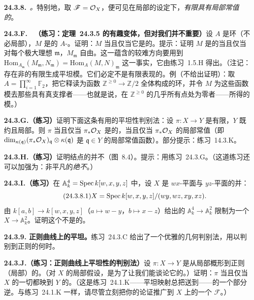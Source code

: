 \textbf{24.3.8.}\ \emph{\trhRemark。}\quad 特别地，取 $\mathscr{F}=\mathcal{O}_X$，便可见在局部\trNoether{}的设定下，\emph{有限\trFlat{}\trMorphism{}具有局部常值的\trDegree}。

\textbf{24.3.F.}\ \hard\ \textbf{（练习：\mbox{定理~24.3.5} 的有趣变体，但对我们并不重要）}\quad 设 $A$ 是环（不必局部），$M$ 是\trFinitelyPresented{}的 $A$-\trModule。证明：$M$ \trFlat{}当且仅当它是\trProjectiveObj{}的。提示：证明 $M$ 是\trProjectiveObj{}的当且仅当对每个极大理想 $\mathfrak{m}$，$M_\mathfrak{m}$ 自由。这一蕴含的较难方向要用到 $\mathrm{Hom}_{A_\mathfrak{m}}(M_\mathfrak{m},N_\mathfrak{m})=\mathrm{Hom}_A(M,N)_\mathfrak{m}$ 这一事实，它由\mbox{练习~1.5.H} 得出。（注记：存在非\trProjectiveObj{}的有限生成平坦模。它们必定不是有限表现的。例（不给出证明）：取 $A=\prod_{i=1}^{\infty}\mathbb{F}_2$，把它释读为函数 $\mathbb{Z}^{\ge 0}\to\mathbb{Z}/2$ 全体构成的环，并令 $M$ 为这些函数模去那些具有真支撑者——也就是说，在 $\mathbb{Z}^{\ge 0}$ 的几乎所有点处为零者——所得的模。）

\textbf{24.3.G.（练习）}\quad 证明下面这条有用的平坦性判别法：设 $\pi\colon X\to Y$ 是有限\trMorphism，$Y$ 既约且局部\trNoether。则 $\pi$ \trFlat{}当且仅当 $\pi_\ast\mathcal{O}_X$ 是\trLocallyFree{}的，当且仅当 $\pi_\ast\mathcal{O}_X$ 的\trRank{}局部常值（即 $\dim_{\kappa(\mathfrak{q})}(\pi_\ast\mathcal{O}_X)_\mathfrak{q}\otimes\kappa(\mathfrak{q})$ 是 $\mathfrak{q}\in Y$ 的局部常值函数）。部分提示：\mbox{练习~14.3.K}。

\textbf{24.3.H.（练习）}\quad 证明结点的\trNormalization{}并不\trFlat（\mbox{图~8.4}）。提示：用\mbox{练习~24.3.G}。（这道练习还可以加强为：非平凡的\trNormalization\emph{绝不}\trFlat。）

\textbf{24.3.I.（练习）}\quad 在 $\mathbb{A}^4_k=\operatorname{Spec} k[w,x,y,z]$ 中，设 $X$ 是 $wx$-平面与 $yz$-平面的并：
\[
\tag{24.3.8.1}\label{eq:two-planes-union}
X=\operatorname{Spec} k[w,x,y,z]/(wy,wz,xy,xz).
\]
由 $k[a,b]\to k[w,x,y,z]$（$a\mapsto w-y$，$b\mapsto x-z$）给出的\trProjection{} $\mathbb{A}^4_k\to\mathbb{A}^2_k$ 限制为一个\trMorphism{} $X\to\mathbb{A}^2_k$。证明这个\trMorphism{}不是\trFlat{}的。

\textbf{24.3.9. 正则曲线上的平坦\trFamily。}\quad \mbox{练习~24.3.C} 给出了一个优雅的几何判别法，用以判别到正则\trCurve{}的\trMorphism{}何时\trFlat。

\textbf{24.3.J.（练习：正则曲线上平坦性的判别法）}\quad 设 $\pi\colon X\to Y$ 是从局部\trNoether{}概形到正则（局部\trNoether）\trCurve{}的\trMorphism。（对 $X$ 的局部\trNoether{}假设，是为了让我们能谈论它的\trAssociatedPoint。）证明：$\pi$ \trFlat{}当且仅当 $X$ 的一切\trAssociatedPoint{}都映到 $Y$ 的\trGenericPoint。（这是\mbox{练习~24.1.K}——平坦映射总把\trAssociatedPoint{}送到\trAssociatedPoint——的一个部分逆。与\mbox{练习~24.1.K} 一样，请尽管立刻把你的论证推广到 $X$ 上的一个\trCoherentSheaf{} $\mathscr{F}$。）

